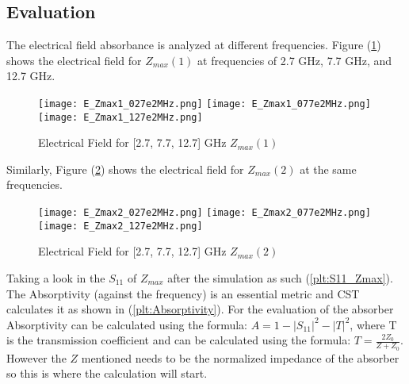     \subsection{\textsf{Evaluation}}

        The electrical field absorbance is analyzed at different frequencies. 
        Figure (\ref{img:E_Zmax1}) shows the electrical field for $Z_{max}(1)$
        at frequencies of 2.7 GHz, 7.7 GHz, and 12.7 GHz.

        \begin{figure}[h]
            \centering
            
            \texttt{[image: E\_Zmax1\_027e2MHz.png]}\hfil
            \texttt{[image: E\_Zmax1\_077e2MHz.png]}\hfil
            \texttt{[image: E\_Zmax1\_127e2MHz.png]}
            
            \caption{Electrical Field for [2.7, 7.7, 12.7] GHz $Z_{max}(1)$}
            \label{img:E_Zmax1}
        \end{figure}

        Similarly, Figure (\ref{img:E_Zmax2}) shows the electrical field for $Z_{max}(2)$
        at the same frequencies.
        \begin{figure}[h]
            \centering
            
            \texttt{[image: E\_Zmax2\_027e2MHz.png]}\hfil
            \texttt{[image: E\_Zmax2\_077e2MHz.png]}\hfil
            \texttt{[image: E\_Zmax2\_127e2MHz.png]}
            
            \caption{Electrical Field for [2.7, 7.7, 12.7] GHz $Z_{max}(2)$}
            \label{img:E_Zmax2}
        \end{figure}

        Taking a look in the $S_{11}$ of $Z_{max}$ after the simulation as such
        (\ref{plt:S11_Zmax}). The Absorptivity (against the frequency) is an
        essential metric and CST calculates it as shown in (\ref{plt:Absorptivity}).
        For the evaluation of the absorber Absorptivity can be calculated using the
        formula: $ A = 1 - |S_{11}|^2 - |T|^2 $, where T is the transmission
        coefficient and can be calculated using the formula: $T =
        \frac{2Z_0}{Z+Z_0}$. However the $Z$ mentioned needs to be the normalized
        impedance of the absorber so this is where the calculation will start.

